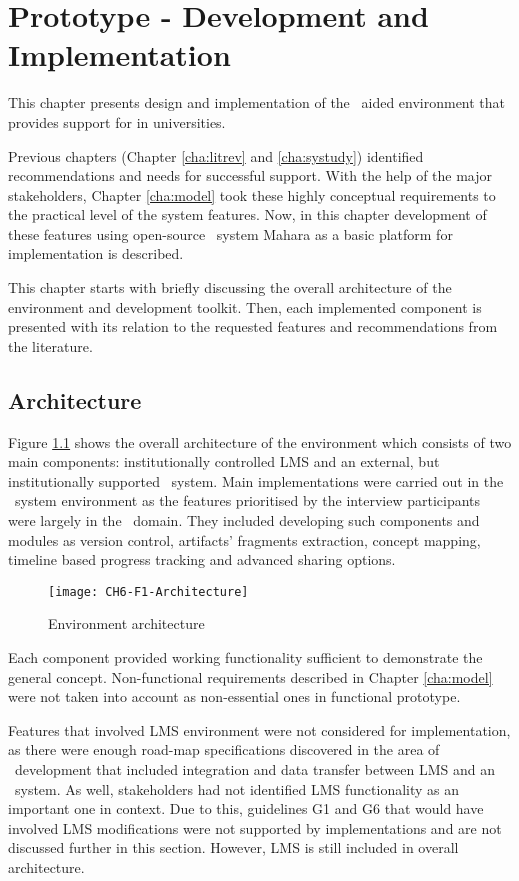 \chapter{Prototype - Development and Implementation\label{cha:prototype}}
This chapter presents design and implementation of the \ep~aided environment
that provides support for \LLLs in universities.

Previous chapters (Chapter \ref{cha:litrev} and \ref{cha:systudy}) identified
recommendations and needs for successful \LLLs support. With the help of the
major stakeholders, Chapter \ref{cha:model} took these highly conceptual
requirements to the practical level of the system features. Now, in this chapter
development of these features using open-source \ep~system Mahara as a basic
platform for implementation is described.

This chapter starts with briefly discussing the overall architecture of the
environment and development toolkit. Then, each implemented component is
presented with its relation to the requested features and \LLLs recommendations
from the literature.

\section{Architecture}

Figure \ref{fig:arch} shows the overall architecture of the environment which
consists of two main components: institutionally controlled LMS and an external,
but institutionally supported \ep~system. Main implementations were carried
out in the \ep~system environment as the features prioritised by the interview
participants were largely in the \ep~domain. They included developing such
components and modules as version control, artifacts' fragments extraction,
concept mapping, timeline based progress tracking and advanced sharing options.

\begin{figure}[htp]
\centering
\texttt{[image: CH6-F1-Architecture]}
\caption{Environment architecture}
\label{fig:arch}
\end{figure}

Each component provided working functionality sufficient to demonstrate the
general concept. Non-functional requirements described in Chapter
\ref{cha:model} were not taken into account as non-essential ones in functional
prototype.

Features that involved LMS environment were not considered for implementation,
as there were enough road-map specifications discovered in the area of
\ep~development that included integration and data transfer between LMS and an
\ep~system. As well, stakeholders had not identified LMS functionality as an
important one in \LLLs context. Due to this, guidelines G1 and G6 that would
have involved LMS modifications were not supported by implementations and are
not discussed further in this section. However, LMS is still included in overall
architecture.

